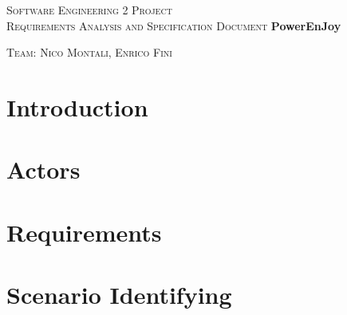 \documentclass[a4paper,12pt,oneside]{book}
\begin{document}
	
	\pagestyle{empty}\centering
	\textsc{\Large Software Engineering 2 Project\\}
	\textsc{Requirements Analysis and Specification Document}
	\vfill
	\textbf{\Huge PowerEnJoy}
	
	\vfill
	\textsc{\Large Team: Nico Montali, Enrico Fini}
	
	\tableofcontents

	\begin{flushleft}
	\chapter{Introduction}\label{cap:Intro}
	
	\chapter{Actors}\label{cap:Actors}
	
	\chapter{Requirements}\label{cap:Requirements}
	
	\chapter{Scenario Identifying}\label{cap:ScenarioIdentifying}
	
	\end{flushleft}
\end{document}
